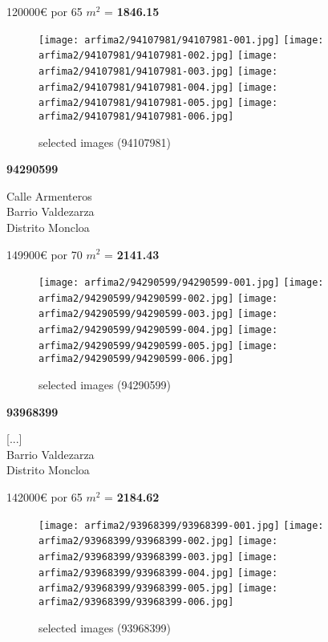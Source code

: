 \documentclass[10pt,a4paper]{report}
\begin{document}
{\large 120000€ por 65 $m^2$ = \color{blue} \textbf{1846.15}}
\begin{figure}[htbp]

\texttt{[image: arfima2/94107981/94107981-001.jpg]}
\texttt{[image: arfima2/94107981/94107981-002.jpg]}
\texttt{[image: arfima2/94107981/94107981-003.jpg]}
\texttt{[image: arfima2/94107981/94107981-004.jpg]}
\texttt{[image: arfima2/94107981/94107981-005.jpg]}
\texttt{[image: arfima2/94107981/94107981-006.jpg]}
\caption{selected images (94107981)}
\end{figure}
\newpage
\begin{center}
\begin{large}
\textbf{94290599}\\[10px]
\end{large}
Calle Armenteros\\
Barrio Valdezarza\\
Distrito Moncloa\\
\end{center}
{\large 149900€ por 70 $m^2$ = \color{blue} \textbf{2141.43}}
\begin{figure}[htbp]

\texttt{[image: arfima2/94290599/94290599-001.jpg]}
\texttt{[image: arfima2/94290599/94290599-002.jpg]}
\texttt{[image: arfima2/94290599/94290599-003.jpg]}
\texttt{[image: arfima2/94290599/94290599-004.jpg]}
\texttt{[image: arfima2/94290599/94290599-005.jpg]}
\texttt{[image: arfima2/94290599/94290599-006.jpg]}
\caption{selected images (94290599)}
\end{figure}
\newpage
\begin{center}
\begin{large}
\textbf{93968399}\\[10px]
\end{large}
[...]\\
Barrio Valdezarza\\
Distrito Moncloa\\
\end{center}
{\large 142000€ por 65 $m^2$ = \color{blue} \textbf{2184.62}}
\begin{figure}[htbp]

\texttt{[image: arfima2/93968399/93968399-001.jpg]}
\texttt{[image: arfima2/93968399/93968399-002.jpg]}
\texttt{[image: arfima2/93968399/93968399-003.jpg]}
\texttt{[image: arfima2/93968399/93968399-004.jpg]}
\texttt{[image: arfima2/93968399/93968399-005.jpg]}
\texttt{[image: arfima2/93968399/93968399-006.jpg]}
\caption{selected images (93968399)}
\end{figure}
\end{document}
